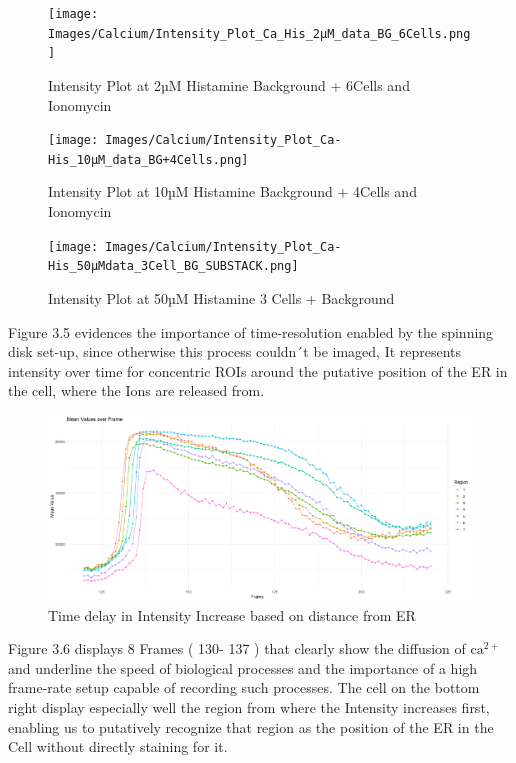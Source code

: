 \documentclass[a4paper,english,12pt,bibliography=totoc]{scrreprt}
\begin{document}
\begin{figure}[H]
    \centering
    \texttt{[image: Images/Calcium/Intensity\_Plot\_Ca\_His\_2µM\_data\_BG\_6Cells.png]}
    \caption{Intensity Plot at 2µM Histamine Background + 6Cells and Ionomycin}
    \label{fig:enter-label}
\end{figure}    

    \begin{figure}[H]
    \centering
    \texttt{[image: Images/Calcium/Intensity\_Plot\_Ca-His\_10µM\_data\_BG+4Cells.png]}
    \caption{Intensity Plot at 10µM Histamine Background + 4Cells and Ionomycin}
    \label{fig:enter-label}
\end{figure}

    \begin{figure}[H]
    \centering
    \texttt{[image: Images/Calcium/Intensity\_Plot\_Ca-His\_50µMdata\_3Cell\_BG\_SUBSTACK.png]}
    \caption{Intensity Plot at 50µM Histamine 3 Cells + Background}
    \label{fig:enter-label}
\end{figure}
    

Figure 3.5 evidences the importance of time-resolution enabled by the spinning disk set-up, since otherwise this process couldn´t be imaged, It represents intensity over time for concentric ROIs around the putative position of the ER in the cell, where the Ions are released from.

    \begin{figure}[H]
    \centering
    \includegraphics[width=0.9\linewidth]{Images/Calcium/Time Delay Because of Diffusion.png}
    \caption{Time delay in Intensity Increase based on distance from ER }
    \label{fig:enter-label}
\end{figure}

Figure 3.6 displays 8 Frames ( 130- 137 ) that clearly show the diffusion of $\mathrm{ca^{2+}}$ and underline the speed of biological processes and the importance of a high frame-rate setup capable of recording such processes. The cell on the bottom right display especially well the region from where the Intensity increases first, enabling us to putatively recognize that region as the position of the ER in the Cell without directly staining for it.
\end{document}
